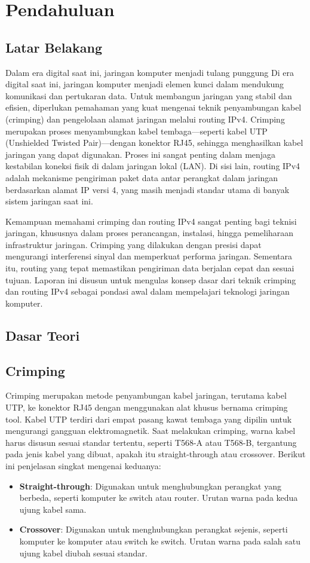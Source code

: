 \section{Pendahuluan}
\subsection{Latar Belakang}
Dalam era digital saat ini, jaringan komputer menjadi tulang punggung Di era digital saat ini, jaringan komputer menjadi elemen kunci dalam mendukung komunikasi dan pertukaran data. Untuk membangun jaringan yang stabil dan efisien, diperlukan pemahaman yang kuat mengenai teknik penyambungan kabel (crimping) dan pengelolaan alamat jaringan melalui routing IPv4. Crimping merupakan proses menyambungkan kabel tembaga—seperti kabel UTP (Unshielded Twisted Pair)—dengan konektor RJ45, sehingga menghasilkan kabel jaringan yang dapat digunakan. Proses ini sangat penting dalam menjaga kestabilan koneksi fisik di dalam jaringan lokal (LAN). Di sisi lain, routing IPv4 adalah mekanisme pengiriman paket data antar perangkat dalam jaringan berdasarkan alamat IP versi 4, yang masih menjadi standar utama di banyak sistem jaringan saat ini.

Kemampuan memahami crimping dan routing IPv4 sangat penting bagi teknisi jaringan, khususnya dalam proses perancangan, instalasi, hingga pemeliharaan infrastruktur jaringan. Crimping yang dilakukan dengan presisi dapat mengurangi interferensi sinyal dan memperkuat performa jaringan. Sementara itu, routing yang tepat memastikan pengiriman data berjalan cepat dan sesuai tujuan. Laporan ini disusun untuk mengulas konsep dasar dari teknik crimping dan routing IPv4 sebagai pondasi awal dalam mempelajari teknologi jaringan komputer.

\subsection{Dasar Teori}
\subsection*{Crimping}
Crimping merupakan metode penyambungan kabel jaringan, terutama kabel UTP, ke konektor RJ45 dengan menggunakan alat khusus bernama crimping tool. Kabel UTP terdiri dari empat pasang kawat tembaga yang dipilin untuk mengurangi gangguan elektromagnetik. Saat melakukan crimping, warna kabel harus disusun sesuai standar tertentu, seperti T568-A atau T568-B, tergantung pada jenis kabel yang dibuat, apakah itu straight-through atau crossover. Berikut ini penjelasan singkat mengenai keduanya:
\begin{itemize}
    \item \textbf{Straight-through}: Digunakan untuk menghubungkan perangkat yang berbeda, seperti komputer ke switch atau router. Urutan warna pada kedua ujung kabel sama.
    \item \textbf{Crossover}: Digunakan untuk menghubungkan perangkat sejenis, seperti komputer ke komputer atau switch ke switch. Urutan warna pada salah satu ujung kabel diubah sesuai standar.
\end{itemize}

